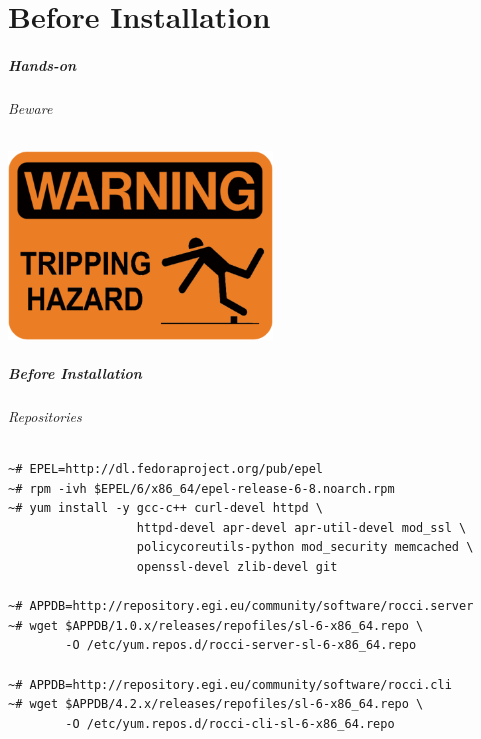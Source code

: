\part{Before Installation}

\begin{frame}
  \frametitle{Hands-on}
  \framesubtitle{Beware}

  \begin{center}
    \includegraphics[width=7cm]{images/warning_logo.png}
  \end{center}
\end{frame}

\begin{frame}[fragile]
  \frametitle{Before Installation}
  \framesubtitle{Repositories}

  \begin{Sbox}
  \Fonttiny
  \begin{minipage}{\linewidth-2\fboxsep-2\fboxrule-4pt}
  \color{white}
  \begin{verbatim}
~# EPEL=http://dl.fedoraproject.org/pub/epel
~# rpm -ivh $EPEL/6/x86_64/epel-release-6-8.noarch.rpm
~# yum install -y gcc-c++ curl-devel httpd \
                  httpd-devel apr-devel apr-util-devel mod_ssl \
                  policycoreutils-python mod_security memcached \
                  openssl-devel zlib-devel git

~# APPDB=http://repository.egi.eu/community/software/rocci.server
~# wget $APPDB/1.0.x/releases/repofiles/sl-6-x86_64.repo \
        -O /etc/yum.repos.d/rocci-server-sl-6-x86_64.repo

~# APPDB=http://repository.egi.eu/community/software/rocci.cli
~# wget $APPDB/4.2.x/releases/repofiles/sl-6-x86_64.repo \
        -O /etc/yum.repos.d/rocci-cli-sl-6-x86_64.repo
  \end{verbatim}
  \end{minipage}
  \end{Sbox}
  \fcolorbox{black}{black}{\TheSbox}
\end{frame}
